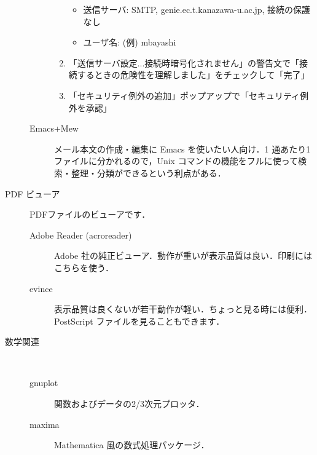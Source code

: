 \documentclass[main]{subfiles}
\begin{document}
\begin{description}
\begin{description}
\begin{enumerate}[itemsep=0.8em]
\begin{itemize}
                    \item 送信サーバ: SMTP, genie.ec.t.kanazawa-u.ac.jp, 接続の保護なし

                    \item ユーザ名: (例) mbayashi
               
                \end{itemize}

            \item 「送信サーバ設定...接続時暗号化されません」の警告文で「接続するときの危険性を理解しました」をチェックして「完了」

            \item 「セキュリティ例外の追加」ポップアップで「セキュリティ例外を承認」

        \end{enumerate}

        \item [Emacs+Mew] メール本文の作成・編集に Emacs を使いたい人向け．1 通あたり1ファイルに分かれるので，Unix コマンドの機能をフルに使って検索・整理・分類ができるという利点がある．

    \end{description}

    \item[PDF ビューア] PDFファイルのビューアです．  

    \begin{description}
        
        \item[Adobe Reader (acroreader)] Adobe 社の純正ビューア．動作が重いが表示品質は良い．印刷にはこちらを使う．

        \item[evince] 表示品質は良くないが若干動作が軽い．ちょっと見る時には便利．PostScript ファイルを見ることもできます．
    
    \end{description}

    \item[数学関連] 　

    \begin{description}

        \item[gnuplot] 関数およびデータの2/3次元プロッタ．

        \item[maxima] Mathematica 風の数式処理パッケージ．
        
    \end{description}


\end{description}
\end{document}
